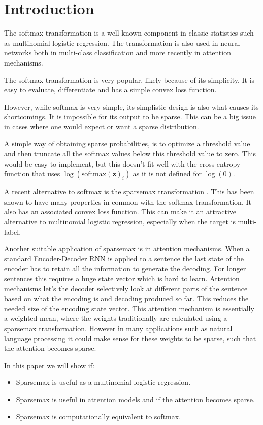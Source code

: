 \section{Introduction}

The softmax transformation is a well known component in classic statistics such as multinomial logistic regression. The transformation is also used in neural networks both in multi-class classification and more recently in attention mechanisms.

The softmax transformation is very popular, likely because of its simplicity. It is easy to evaluate, differentiate and has a simple convex loss function.

However, while softmax is very simple, its simplistic design is also what causes its shortcomings. It is impossible for its output to be sparse. This can be a big issue in cases where one would expect or want a sparse distribution.

A simple way of obtaining sparse probabilities, is to optimize a threshold value and then truncate all the softmax values below this threshold value to zero. This would be easy to implement, but this doesn't fit well with the cross entropy function that uses $\log(\mathrm{softmax}(\mathbf{z})_i)$ as it is not defined for $\log(0)$.

A recent alternative to softmax is the sparsemax transformation \cite{sparsemax}. This has been shown to have many properties in common with the softmax transformation. It also has an associated convex loss function. This can make it an attractive alternative to multinomial logistic regression, especially when the target is multi-label.

Another suitable application of sparsemax is in attention mechanisms. When a standard Encoder-Decoder RNN is applied to a sentence the last state of the encoder has to retain all the information to generate the decoding. For longer sentences this requires a huge state vector which is hard to learn. Attention mechanisms let's the decoder selectively look at different parts of the sentence based on what the encoding is and decoding produced so far. This reduces the needed size of the encoding state vector. This attention mechanism is essentially a weighted mean, where the weights traditionally are calculated using a sparsemax transformation. However in many applications such as natural language processing it could make sense for these weights to be sparse, such that the attention becomes sparse.

In this paper we will show if:
\begin{itemize}
\item Sparsemax is useful as a multinomial logistic regression.
\item Sparsemax is useful in attention models and if the attention becomes sparse.
\item Sparsemax is computationally equivalent to softmax.
\end{itemize}
